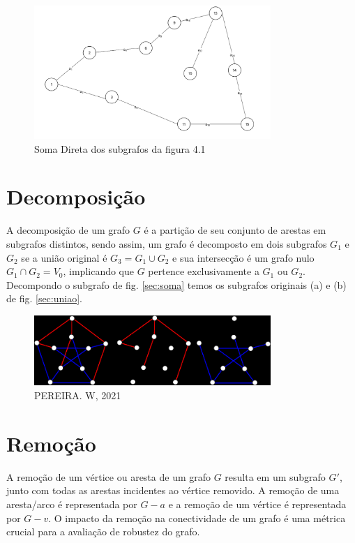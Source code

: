 \documentclass[
12pt,
a4paper,
semrecuonosumario,
sumario = abnt-6027-2012]{report}
\begin{document}
    \begin{figure}[!h]
        \centering
        \includegraphics[width=0.8\textwidth]{figuras/subgrafos/subgrafo_soma_direta.png}
        \caption{Soma Direta dos subgrafos da figura 4.1}
            \label{fig:somaDiretaGrafos}
    \end{figure}

	\section{Decomposição}\label{sec:decomposicao}
    A decomposição de um grafo $G$ é a partição de seu conjunto de arestas em subgrafos distintos, sendo assim, um grafo é decomposto em dois subgrafos $G_1$ e $G_2$ se a união original é $G_3 = G_1 \cup G_2$ e sua intersecção é um grafo nulo $G_1 \cap G_2 = V_0$, implicando que $G$ pertence exclusivamente a $G_1$ ou $G_2$. Decompondo o subgrafo de fig. \ref{sec:soma} temos os subgrafos originais (a) e (b) de fig. \ref{sec:uniao}.

    \begin{figure}[!h]
        \centering
        \includegraphics[width=0.8\textwidth]{figuras/images.png}
        \caption{PEREIRA. W, 2021}
            \label{fig:decomposicao}
    \end{figure}

	\section{Remoção}\label{sec:remocao}
    A remoção de um vértice ou aresta de um grafo $G$ resulta em um subgrafo $G'$, junto com todas as arestas incidentes ao vértice removido. A remoção de uma aresta/arco é representada por $G - a$ e a remoção de um vértice é representada por $G - v$. O impacto da remoção na conectividade de um grafo é uma métrica crucial para a avaliação de robustez do grafo.
\end{document}
